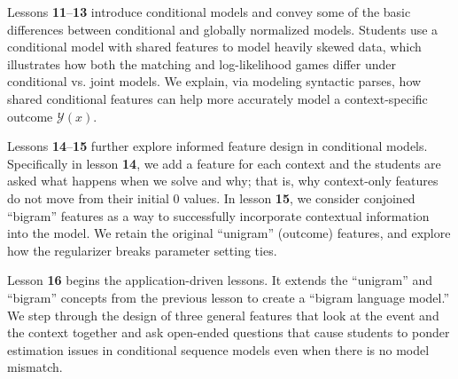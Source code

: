 \documentclass[11pt,letterpaper]{article}
\begin{document}
Lessons \textbf{11}--\textbf{13} introduce conditional models and convey some of the basic differences between 
conditional and globally normalized models. Students use a conditional model with shared features to model 
heavily skewed data, which illustrates how both the matching and log-likelihood games differ under conditional vs. 
joint models. We explain, via modeling syntactic parses, how shared conditional features can help more accurately 
model a context-specific outcome $\mathcal{Y}(x)$.

Lessons \textbf{14}--\textbf{15} further explore informed feature design in conditional models. 
Specifically in lesson \textbf{14}, we add a feature for each context and the students are asked what happens 
when we solve and why; that is, why context-only features do not move from their initial 0 values. 
In lesson \textbf{15}, we consider conjoined ``bigram'' features as a way to successfully incorporate 
contextual information into the model. We retain the original ``unigram'' (outcome) features, and explore
how the regularizer breaks parameter setting ties.

Lesson \textbf{16} begins the application-driven lessons. It extends the ``unigram'' and ``bigram'' concepts 
from the previous lesson to create a ``bigram language model.'' We step through the design of three general 
features that look at the event and the context together and ask open-ended questions that cause students 
to ponder estimation issues in conditional sequence models even when there is no model mismatch.
\end{document}
